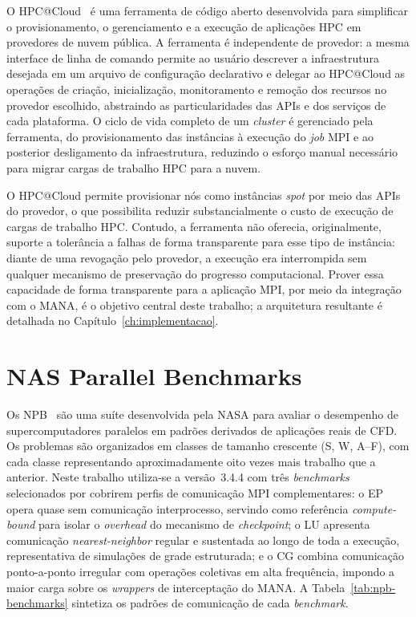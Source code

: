 O HPC@Cloud~\cite{munhoz2024hpccloud,munhoz2023thesis} é uma ferramenta de código aberto
desenvolvida para simplificar o provisionamento, o gerenciamento e a execução de aplicações HPC
em provedores de nuvem pública. A ferramenta é independente de provedor: a mesma interface de
linha de comando permite ao usuário descrever a infraestrutura desejada em um arquivo de
configuração declarativo e delegar ao HPC@Cloud as operações de criação, inicialização,
monitoramento e remoção dos recursos no provedor escolhido, abstraindo as particularidades das
\glspl{API} e dos serviços de cada plataforma. O ciclo de vida completo de um \textit{cluster}
é gerenciado pela ferramenta, do provisionamento das instâncias à execução do \textit{job} MPI
e ao posterior desligamento da infraestrutura, reduzindo o esforço manual necessário para
migrar cargas de trabalho HPC para a nuvem.

O HPC@Cloud permite provisionar nós como instâncias \textit{spot} por meio das
\glspl{API} do provedor, o que possibilita reduzir substancialmente o custo de execução
de cargas de trabalho HPC. Contudo, a ferramenta não oferecia, originalmente, suporte a
tolerância a falhas de forma transparente para esse tipo de instância: diante de uma
revogação pelo provedor, a execução era interrompida sem qualquer mecanismo de preservação
do progresso computacional. Prover essa capacidade de forma transparente para a
aplicação MPI, por meio da integração com o MANA, é o objetivo central deste trabalho; a
arquitetura resultante é detalhada no Capítulo~\ref{ch:implementacao}.


\section{NAS Parallel Benchmarks}
\label{sec:npb}

Os \gls{NPB}~\cite{bailey1991nas} são uma suíte desenvolvida pela NASA para avaliar o
desempenho de supercomputadores paralelos em padrões derivados de aplicações reais de
\gls{CFD}. Os problemas são organizados em classes de tamanho crescente (S, W, A--F),
com cada classe representando aproximadamente oito vezes mais trabalho que a anterior.
Neste trabalho utiliza-se a versão~3.4.4 com três \textit{benchmarks} selecionados por cobrirem
perfis de comunicação MPI complementares: o \gls{EP} opera quase sem comunicação
interprocesso, servindo como referência \textit{compute-bound} para isolar o \textit{overhead} do
mecanismo de \textit{checkpoint}; o \gls{LU} apresenta comunicação \textit{nearest-neighbor}
regular e sustentada ao longo de toda a execução, representativa de simulações de grade
estruturada; e o \gls{CG} combina comunicação ponto-a-ponto irregular com operações
coletivas em alta frequência, impondo a maior carga sobre os \textit{wrappers} de
interceptação do MANA. A Tabela~\ref{tab:npb-benchmarks} sintetiza os padrões de
comunicação de cada \textit{benchmark}.

